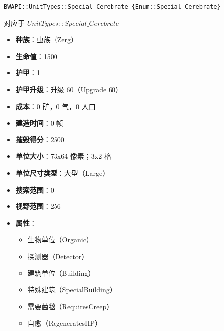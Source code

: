 \begin{tcolorbox}[colback=white, colframe=black!60!white, title=Special\_Cerebrate(), arc=0mm]
    \begin{verbatim}
BWAPI::UnitTypes::Special_Cerebrate {Enum::Special_Cerebrate}
    \end{verbatim}
    对应于  $UnitTypes::Special\_Cerebrate$ 
    \begin{itemize}
        \item \textbf{种族}：虫族（Zerg）
        \item \textbf{生命值}：1500
        \item \textbf{护甲}：1
        \item \textbf{护甲升级}：升级 60（Upgrade 60）
        \item \textbf{成本}：0 矿，0 气，0 人口
        \item \textbf{建造时间}：0 帧
        \item \textbf{摧毁得分}：2500
        \item \textbf{单位大小}：73x64 像素；3x2 格
        \item \textbf{单位尺寸类型}：大型（Large）
        \item \textbf{搜索范围}：0
        \item \textbf{视野范围}：256
        \item \textbf{属性}：
            \begin{itemize}
                \item 生物单位（Organic）
                \item 探测器（Detector）
                \item 建筑单位（Building）
                \item 特殊建筑（SpecialBuilding）
                \item 需要菌毯（RequiresCreep）
                \item 自愈（RegeneratesHP）
            \end{itemize}
    \end{itemize}
\end{tcolorbox}

